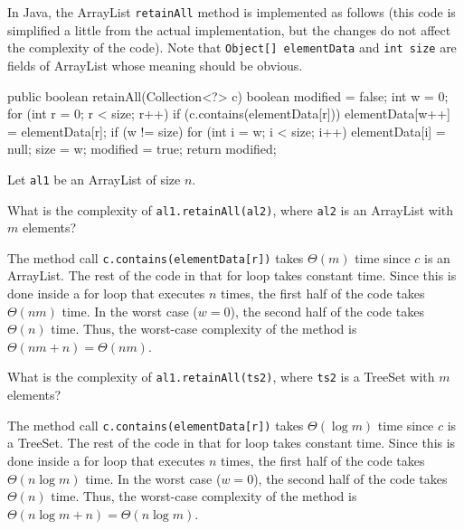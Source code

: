 \begin{exa}\label{exa:retainAllAL}
In Java, the ArrayList \verb+retainAll+ method is implemented as follows 
(this code is simplified a little from the actual implementation, but the changes do not affect the complexity of the code).  
Note that \verb+Object[] elementData+ and \verb+int size+ are fields of ArrayList whose meaning should be obvious.
\begin{code}
  public boolean retainAll(Collection<?> c) {
      boolean modified = false;
      int w = 0;
      for (int r = 0; r < size; r++) {
          if (c.contains(elementData[r])) {
              elementData[w++] = elementData[r];
          }
      }
      if (w != size) {
          for (int i = w; i < size; i++)
              elementData[i] = null;
          size = w;
          modified = true;
      }
      return modified;
  }
\end{code}
Let \verb+al1+ be an ArrayList of size $n$.
\begin{lenum}
\item
What is the complexity of \verb+al1.retainAll(al2)+, where \verb+al2+ is an ArrayList with $m$ elements?
\begin{sol}
The method call \verb+c.contains(elementData[r])+ takes $\Theta(m)$ time since $c$
is an ArrayList.  The rest of the code in that for loop takes constant time.
Since this is done inside a for loop that executes $n$ times, the first 
half of the code takes $\Theta(n m)$ time.
In the worst case ($w=0$), the second half of the code takes $\Theta(n)$ time.
Thus, the worst-case complexity of the method is $\Theta(n m+n)=\Theta(n m)$.
\end{sol}
\item
What is the complexity of \verb+al1.retainAll(ts2)+, where \verb+ts2+ is a TreeSet with $m$ elements?
\begin{sol}
The method call \verb+c.contains(elementData[r])+ takes $\Theta(\log m)$ time since $c$
is a TreeSet.  The rest of the code in that for loop takes constant time.
Since this is done inside a for loop that executes $n$ times, the first 
half of the code takes $\Theta(n \log m)$ time.
In the worst case ($w=0$), the second half of the code takes $\Theta(n)$ time.
Thus, the worst-case complexity of the method is $\Theta(n \log m+n)=\Theta(n \log m)$.
\end{sol}
\end{lenum}
\end{exa}

